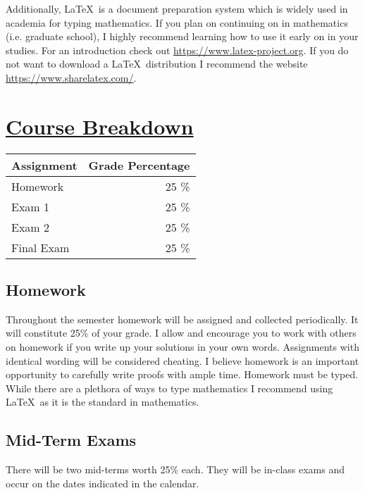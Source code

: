 \documentclass[11pt]{article}
\begin{document}
\noindent Additionally, \LaTeX\ is a document preparation system which is widely used in academia for typing mathematics. If you plan on continuing on in mathematics (i.e. graduate school), I highly recommend learning how to use it early on in your studies. For an introduction check out \href{https://www.latex-project.org}{https://www.latex-project.org}. If you do not want to download a \LaTeX\ distribution I recommend the website \href{https://www.sharelatex.com/}{https://www.sharelatex.com/}.


\section*{\underline{Course Breakdown}}
\begin{center}
{\renewcommand{\arraystretch}{1.2}%
\begin{tabular}{|l|r|}
\hline
Assignment& Grade Percentage\\
\hline
Homework & 25 \%\\
Exam 1& 25 \%\\
Exam 2& 25 \% \\
Final Exam& 25 \%\\
\hline
\end{tabular}}
\end{center}
\subsection*{Homework}
Throughout the semester homework will be assigned and collected periodically. It will constitute 25\% of your grade. I allow and encourage you to work with others on homework if you write up your solutions in your own words. Assignments with identical wording will be considered cheating. I believe homework is an important opportunity to carefully write proofs with ample time. Homework must be typed. While there are a plethora of ways to type mathematics I recommend using \LaTeX\  as it is the standard in mathematics. 
\subsection*{Mid-Term Exams}
There will be two mid-terms worth 25\% each. They will be in-class exams and occur on the dates indicated in the calendar.%
\end{document}
